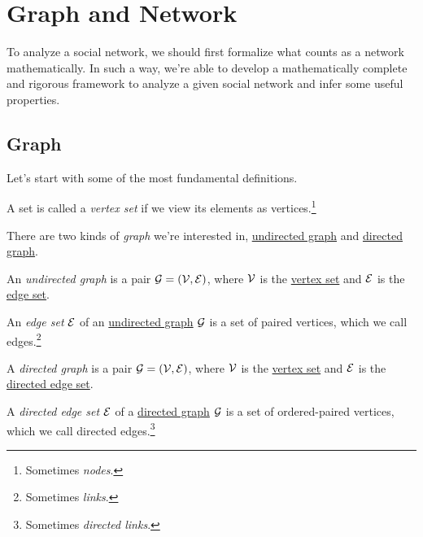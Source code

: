 \chapter{Graph and Network}
To analyze a social network, we should first formalize what counts as a network mathematically. In such a way, we're able to develop a mathematically complete and rigorous framework to analyze a given social network and infer some useful properties.

\section{Graph}
Let's start with some of the most fundamental definitions.

\begin{definition}\label{def:vertex-set}
	A set is called a \emph{vertex set} if we view its elements as vertices.\footnote{Sometimes \emph{nodes}.}
\end{definition}

\begin{definition}[Graph]\label{def:graph}
	There are two kinds of \emph{graph} we're interested in, \hyperref[def:undirected-graph]{undirected graph} and \hyperref[def:directed-graph]{directed graph}.
	\begin{definition}\label{def:undirected-graph}
		An \emph{undirected graph} is a pair \(\mathcal{G} = (\mathcal{\MakeUppercase{v}} , \mathcal{\MakeUppercase{e}} )\), where \(\mathcal{\MakeUppercase{v}} \) is the \hyperref[def:vertex-set]{vertex set} and \(\mathcal{\MakeUppercase{e}} \) is the \hyperref[def:edge-set]{edge set}.

		\begin{definition}\label{def:edge-set}
			An \emph{edge set} \(\mathcal{\MakeUppercase{e}} \) of an \hyperref[def:undirected-graph]{undirected graph} \(\mathcal{\MakeUppercase{g}} \) is a set of paired vertices, which we call edges.\footnote{Sometimes \emph{links}.}
		\end{definition}
	\end{definition}

	\begin{definition}\label{def:directed-graph}
		A \emph{directed graph} is a pair \(\mathcal{\MakeUppercase{g}} = (\mathcal{\MakeUppercase{v}}, \mathcal{\MakeUppercase{e}} )\), where \(\mathcal{\MakeUppercase{v}} \) is the \hyperref[def:vertex-set]{vertex set} and \(\mathcal{\MakeUppercase{e}} \) is the \hyperref[def:directed-edge-set]{directed edge set}.

		\begin{definition}\label{def:directed-edge-set}
			A \emph{directed edge set} \(\mathcal{\MakeUppercase{e}} \) of a \hyperref[def:directed-graph]{directed graph} \(\mathcal{\MakeUppercase{g}} \) is a set of ordered-paired vertices, which we call directed edges.\footnote{Sometimes \emph{directed links}.}
		\end{definition}
	\end{definition}
\end{definition}

